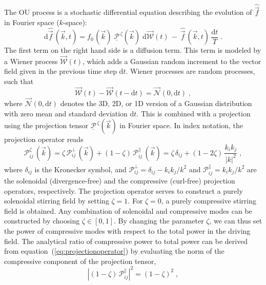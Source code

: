 The OU process is a stochastic differential equation describing the evolution of $\widehat{\vec{f}}$
in Fourier space ($k$-space):
\begin{equation} \label{eq:ou}
\mathrm{d}\widehat{\vec{f}}\,(\vec{k},t) = f_{0\,}(\vec{k})\;\mathcal{\underline{P}}^{\,\zeta}(\vec{k})\;
\mathrm{d}\mathcal{\vec{W}}(t)\,-\,\widehat{\vec{f}}\,(\vec{k},t)\,\frac{\mathrm{d}t}{T}\;.
\end{equation}
The first term on the right hand side is a diffusion term. This term is modeled by a Wiener process
$\mathcal{\vec{W}}(t)$, which adds a Gaussian random increment to the vector field given in the previous
time step $\mathrm{d}t$. Wiener processes are random processes, such that
\begin{equation}
\mathcal{\vec{W}}(t)-\mathcal{\vec{W}}(t-\mathrm{d}t)=\mathcal{\vec{N}}(0,\mathrm{d}t)\;,
\end{equation}
where $\mathcal{\vec{N}}(0,\mathrm{d}t)$ denotes the 3D, 2D, or 1D version of a Gaussian distribution
with zero mean and standard deviation $\mathrm{d}t$. This is combined with a projection using the
projection tensor $\mathcal{\underline{P}}^{\,\zeta}(\vec{k})$ in Fourier space. In index notation, the
projection operator reads
\begin{equation} \label{eq:projectionoperator}
\mathcal{P}_{ij}^\zeta\,(\vec{k}) = \zeta\,\mathcal{P}_{ij}^\perp\,(\vec{k})+(1-\zeta)\,
\mathcal{P}_{ij}^\parallel\,(\vec{k}) = \zeta\,\delta_{ij}+(1-2\zeta)\,\frac{k_i k_j}{|k|^2}\;,
\end{equation}
where $\delta_{ij}$ is the Kronecker symbol, and $\mathcal{P}_{ij}^\perp = \delta_{ij} - k_i k_j / k^2$
and $\mathcal{P}_{ij}^\parallel = k_i k_j / k^2$ are the solenoidal (divergence-free) and the compressive
(curl-free) projection operators, respectively. The projection operator serves to construct a purely
solenoidal stirring field by setting $\zeta=1$. For $\zeta=0$, a purely compressive stirring field
is obtained. Any combination of solenoidal and compressive modes can be constructed by choosing
$\zeta\in[0,1]$. By changing the parameter $\zeta$, we can thus set the power of compressive modes
with respect to the total power in the driving field. The analytical ratio of compressive power to
total power can be derived from equation~(\ref{eq:projectionoperator}) by evaluating the norm of the
compressive component of the projection tensor,
\begin{equation} \label{eq:Flong}
\left|(1-\zeta)\,\mathcal{P}_{ij}^\parallel\right|^2 = (1-\zeta)^2\;,
\end{equation}
